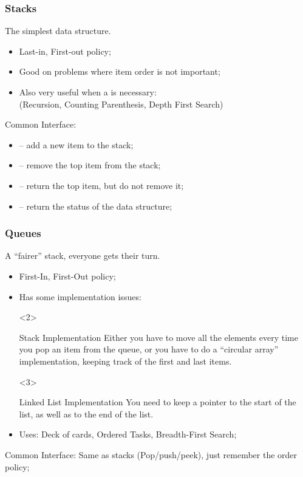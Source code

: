 \begin{frame}
  \frametitle{Stacks}
  \begin{center}
    The simplest data structure.
  \end{center}
  \begin{itemize}
    \item Last-in, First-out policy;
    \item Good on problems where item order is not important;
    \item Also very useful when a  is necessary:\\
      {\small(Recursion, Counting Parenthesis, Depth First Search)}
  \end{itemize}
  \begin{block}{Common Interface:}
    \begin{itemize}
    \item {} -- add a new item to the stack;
    \item {} -- remove the top item from the stack;
    \item {} -- return the top item, but do not remove it;
    \item {} -- return the status of the data structure;
    \end{itemize}
  \end{block}
\end{frame}

\begin{frame}
  \frametitle{Queues}
  \begin{center}
    A ``fairer'' stack, everyone gets their turn.
  \end{center}
  \begin{itemize}
  \item First-In, First-Out policy;
  \item Has some implementation issues:\\
    {\small
    \begin{onlyenv}<2>
      \begin{block}{Stack Implementation}
        Either you have to move all the elements every time you pop an
        item from the queue, or you have to do a ``circular array''
        implementation, keeping track of the first and last items.
      \end{block}
    \end{onlyenv}
    \begin{onlyenv}<3>
      \begin{block}{Linked List Implementation}
        You need to keep a pointer to the start of the list, as well
        as to the end of the list.
      \end{block}
    \end{onlyenv}}
  \item Uses: Deck of cards, Ordered Tasks, Breadth-First Search;
  \end{itemize}
  \begin{block}{Common Interface:}
    Same as stacks (Pop/push/peek), just remember the order policy;
  \end{block}
\end{frame}

